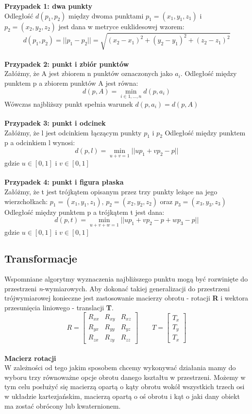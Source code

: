 \documentclass[12pt]{article}
\begin{document}
\textbf{Przypadek 1: dwa punkty}
\\
Odległość $d(p_{1}, p_{2})$ między dwoma punktami $p_{1} = (x_{1}, y_{1}, z_{1})$
i $p_{2} = (x_{2}, y_{2}, z_{2})$ jest dana w metryce euklidesowej wzorem: 
\[d(p_{1}, p_{2}) = ||p_{1} - p_{2}|| = \sqrt{(x_{2}-x_{1})^2+(y_{2}-y_{1})^2+(z_{2}-z_{1})^2}\]
\\
\textbf{Przypadek 2: punkt i zbiór punktów}
\\
Załóżmy, że A jest zbiorem n punktów oznaczonych jako $a_{i}$. Odległość między punktem p a zbiorem punktów A jest równa:
\[d(p, A) = \min_{i \in {1,...,n}} d(p, a_{i})\]
Wówczas najbliższy punkt spełnia warunek $d(p, a_{i}) = d(p, A)$
\\
\\
\textbf{Przypadek 3: punkt i odcinek}
\\
Załóżmy, że l jest odcinkiem łączącym punkty $p_{1}$ i $p_{2}$ Odległość między punktem p a odcinkiem l wynosi:
\[d(p, l) = \min_{u+v=1} ||up_{1}+vp_{2}-p|| \]
gdzie $u \in [0, 1]$ i $v \in [0, 1]$ 
\\
\\
\textbf{Przypadek 4: punkt i figura płaska}
\\
Załóżmy, że t jest trójkątem opisanym przez trzy punkty leżące na jego wierzchołkach: $p_{1} = (x_{1}, y_{1}, z_{1})$, $p_{2} = (x_{2}, y_{2}, z_{2})$ oraz $p_{3} = (x_{3}, y_{3}, z_{3})$ Odległość między punktem p a trójkątem t jest dana:
\[d(p, t) = \min_{u+v+w=1} ||up_{1}+vp_{2}-p+wp_{3}-p|| \]
gdzie $u \in [0, 1]$ i $v \in [0, 1]$ 
\\
\subsection{Transformacje}
Wspomniane algorytmy wyznaczenia najbliższego punktu mogą być rozwinięte do przestrzeni \emph{n}-wymiarowych. Aby dokonać takiej generalizacji do przestrzeni trójwymiarowej konieczne jest zastosowanie macierzy obrotu - rotacji \textbf{R} i wektora przesunięcia liniowego - translacji \textbf{T}.
\[
R = \begin{bmatrix}
R_{xx} & R_{xy} & R_{xz} \\
R_{yx} & R_{yy} & R_{yz} \\
R_{zx} & R_{zy} & R_{zz}
\end{bmatrix}
\qquad
T = \begin{bmatrix}
T_{x} \\ T_{y} \\ T_{x}
\end{bmatrix}
\]
\\
\textbf{Macierz rotacji}
\\
W zależności od tego jakim sposobem chcemy wykonywać działania mamy do wyboru trzy równoważne opcje obrotu danego kształtu w przestrzeni. Możemy w tym celu posłużyć się macierzą opartą o kąty obrotu wokół wszystkich trzech osi w układzie kartezjańskim, macierzą opartą o oś obrotu i kąt o jaki dany obiekt ma zostać obrócony lub kwaternionem.
\end{document}
